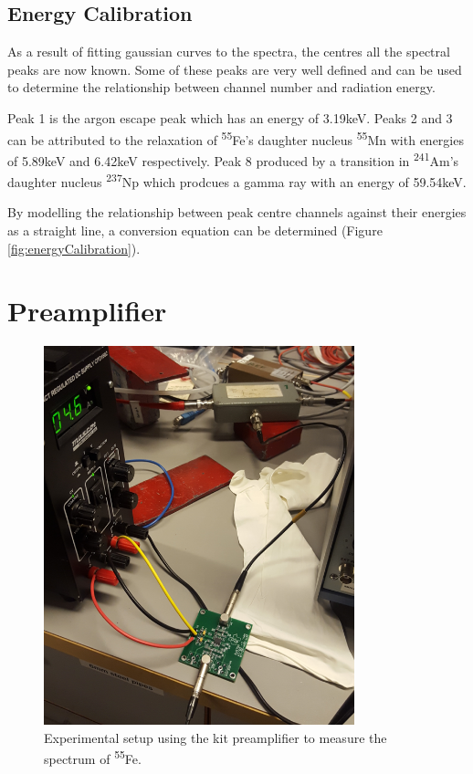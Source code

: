 \subsection{Energy Calibration}

As a result of fitting gaussian curves to the spectra, the centres all the spectral peaks are now known. Some of these peaks are very well defined and can be used to determine the relationship between channel number and radiation energy.

Peak 1 is the argon escape peak which has an energy of 3.19keV. Peaks 2 and 3 can be attributed to the relaxation of \textsuperscript{55}Fe's daughter nucleus \textsuperscript{55}Mn with energies of 5.89keV and 6.42keV respectively. Peak 8 produced by a transition in \textsuperscript{241}Am's daughter nucleus \textsuperscript{237}Np which prodcues a gamma ray with an energy of 59.54keV.

By modelling the relationship between peak centre channels against their energies as a straight line, a conversion equation can be determined (Figure \ref{fig:energyCalibration}).

\section{Preamplifier}

\begin{figure}[h]
  \centering
  \includegraphics[width=9cm]{preampSpectrumSetup.png}
  \caption{Experimental setup using the kit preamplifier to measure the spectrum of \textsuperscript{55}Fe.}
  \label{fig:preampSpecSetup}
\end{figure}

